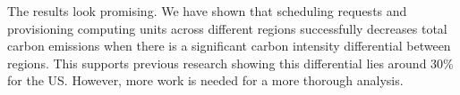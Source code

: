 The results look promising. We have shown that scheduling requests and provisioning computing units across different regions successfully decreases total carbon emissions when there is a significant carbon intensity differential between regions. This supports previous research showing this differential lies around $30\%$ for the US. However, more work is needed for a more thorough analysis.